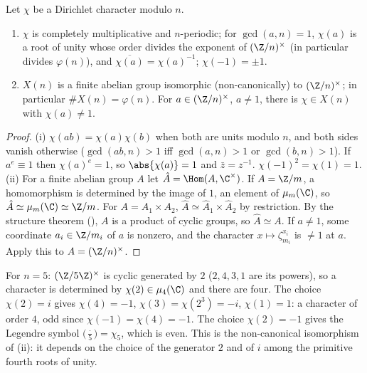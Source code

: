 \begin{proposition}\label{prop:rings:dirichlet}
Let $\chi$ be a Dirichlet character modulo $n$.
\begin{enumerate}[label=(\roman*)]
\item $\chi$ is completely multiplicative and $n$-periodic; for $\gcd(a,n)=1$, $\chi(a)$ is a root of unity whose order divides the exponent of
$(\Z/n)^\times$ (in particular divides $\varphi(n)$), and $\overline{\chi(a)}=\chi(a)^{-1}$; $\chi(-1)=\pm1$.
\item $X(n)$ is a finite abelian group isomorphic (non-canonically) to $(\Z/n)^\times$; in particular $\#X(n)=\varphi(n)$. For $a\in(\Z/n)^\times$, $a\ne1$, there
is $\chi\in X(n)$ with $\chi(a)\ne1$.
\end{enumerate}
\end{proposition}

\begin{proof}
(i) $\chi(ab)=\chi(a)\chi(b)$ when both are units modulo $n$, and both sides vanish otherwise ($\gcd(ab,n)>1$ iff $\gcd(a,n)>1$ or $\gcd(b,n)>1$).
If $a^e\equiv1$ then $\chi(a)^e=1$, so $\abs{\chi(a)}=1$ and $\bar z=z^{-1}$. $\chi(-1)^2=\chi(1)=1$.
(ii) For a finite abelian group $A$ let $\hat A=\Hom(A,\C^\times)$. If $A=\Z/m$, a homomorphism is determined by the image of $1$, an element of
$\mu_m(\C)$, so $\hat A\simeq\mu_m(\C)\simeq\Z/m$. For $A=A_1\times A_2$, $\hat A\simeq\hat A_1\times\hat A_2$ by restriction. By the structure theorem
(), $A$ is a product of cyclic groups, so $\hat A\simeq A$. If $a\ne1$, some coordinate $a_i\in\Z/m_i$ of $a$ is nonzero, and the
character $x\mapsto\zeta_{m_i}^{x_i}$ is $\ne1$ at $a$. Apply this to $A=(\Z/n)^\times$.
\end{proof}

For $n=5$: $(\Z/5\Z)^\times$ is cyclic generated by $2$ ($2,4,3,1$ are its powers), so a character is determined by $\chi(2)\in\mu_4(\C)$ and there are four. The
choice $\chi(2)=i$ gives $\chi(4)=-1$, $\chi(3)=\chi(2^3)=-i$, $\chi(1)=1$: a character of order $4$, odd since $\chi(-1)=\chi(4)=-1$. The choice $\chi(2)=-1$ gives
the Legendre symbol $\bigl(\frac\cdot5\bigr)=\chi_5$, which is even. This is the non-canonical isomorphism of (ii): it depends on the choice of the generator $2$ and
of $i$ among the primitive fourth roots of unity.

